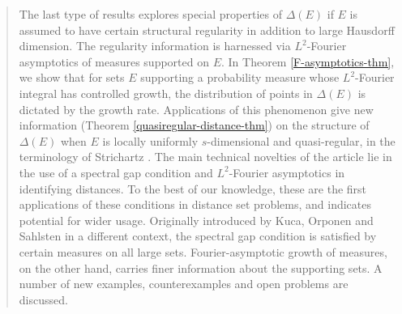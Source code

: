 \documentclass[a4paper,11pt]{amsart}
\numberwithin{equation}{section}
\begin{document}
\begin{abstract}
\vskip0.05in
\noindent The last type of results explores special properties of $\Delta(E)$ if $E$ is assumed to have certain structural regularity in addition to large Hausdorff dimension. The regularity information is harnessed via $L^2$-Fourier asymptotics of measures supported on $E$. In Theorem \ref{F-asymptotics-thm}, we show that for sets $E$ supporting a probability measure whose $L^2$-Fourier integral has controlled growth, the distribution of points in $\Delta(E)$ is dictated by the growth rate. Applications of this phenomenon give new information (Theorem \ref{quasiregular-distance-thm}) on the structure of $\Delta(E)$ when $E$ is locally uniformly $s$-dimensional and quasi-regular, in the terminology of Strichartz \cite{Strichartz-Asymptotics}. 
\vskip0.05in
\noindent The main technical novelties of the article lie in the use of a spectral gap condition and $L^2$-Fourier asymptotics in identifying distances.  To the best of our knowledge, these are the first applications of these conditions in distance set problems, and indicates potential for wider usage. Originally introduced by Kuca, Orponen and Sahlsten \cite{Kuca-Orponen-Sahlsten} in a different context, the spectral gap condition is satisfied by certain measures on all large sets. Fourier-asymptotic growth of measures, on the other hand, carries finer information about the supporting sets. A number of new examples, counterexamples and open problems are discussed.      
\end{abstract} 

 \tableofcontents
\end{document}
